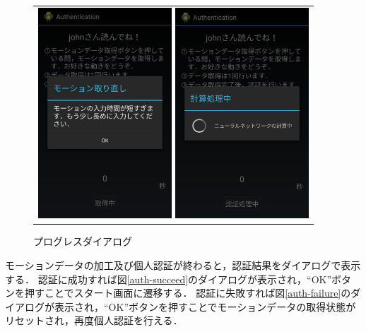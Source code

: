 \begin{figure}[bthp]
  \centering
  \begin{tabular}{c}
    \begin{minipage}{0.5\hsize}
      \centering
      \includegraphics[bb=0 0 1080 1705, width=5cm]{Screenshots/auth-recollect.pdf}
      \caption{データ再入力ダイアログ}
      \label{auth-recollect}
    \end{minipage}
    \begin{minipage}{0.5\hsize}
      \centering
      \includegraphics[bb=0 0 1080 1705, width=5cm]{Screenshots/auth-progress.pdf}
      \caption{プログレスダイアログ}
      \label{auth-progress}
    \end{minipage}
  \end{tabular}
\end{figure}

モーションデータの加工及び個人認証が終わると，認証結果をダイアログで表示する．
認証に成功すれば図\ref{auth-succeed}のダイアログが表示され，``OK''ボタンを押すことでスタート画面に遷移する．
認証に失敗すれば図\ref{auth-failure}のダイアログが表示され，``OK''ボタンを押すことでモーションデータの取得状態がリセットされ，再度個人認証を行える．

